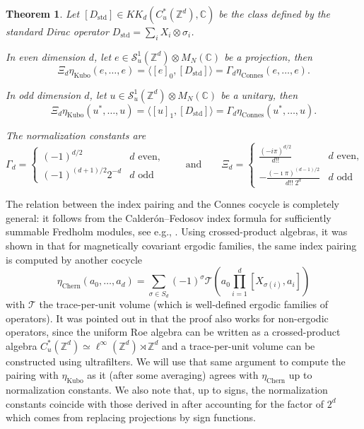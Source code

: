 \documentclass[12pt]{amsart}
\newtheorem{theorem}{Theorem}[section]
\newcommand{\CM}{{\mathbb C}}
\newcommand{\ZM}{{\mathbb Z}}
\newcommand{\Ss}{{\mathcal S}}
\newcommand{\Tt}{{\mathcal T}}
\begin{document}
\begin{theorem}
\label{th:kubozd}
Let $[D_{\mathrm{std}}]\in KK_{d}(C^*_u(\ZM^d),\CM)$ be the class defined by the standard Dirac operator $D_{\mathrm{std}} = \sum_i X_i \otimes \sigma_i$.

In even dimension $d$, let $e \in \Ss_u^1(\ZM^d) \otimes M_N(\CM)$ be a projection, then
$$ \Xi_d \eta_{\mathrm{Kubo}}(e,\dots,e)=\langle [e]_0, [D_{\mathrm{std}}]\rangle = \Gamma_d \eta_{\mathrm{Connes}}(e,\dots,e).$$

In odd dimension $d$, let $u \in \Ss_u^1(\ZM^d) \otimes M_N(\CM)$ be a unitary, then
$$ \Xi_d \eta_{\mathrm{Kubo}}(u^*,\dots,u)= \langle [u]_1, [D_{\mathrm{std}}]\rangle= \Gamma_d \eta_{\mathrm{Connes}}(u^*,\dots,u).$$ 

The normalization constants are
\begin{equation}\label{eqn:dirac_phase_index}
\Gamma_d = \begin{cases}
    (-1)^{d/2}  & d\text{ even}, \\
    (-1)^{(d+1)/2}2^{-d} & d\text{ odd}
\end{cases} \qquad \text{and} \qquad 
\Xi_d = \begin{cases}
    \frac{(-i\pi)^{d/2}}{d!!} & d\text{ even}, \\
    -\frac{ (-\imath \pi)^{(d-1)/2}}{d!!\; 2^d} & d\text{ odd}
\end{cases}
\end{equation}
\end{theorem}
The relation between the index pairing and the Connes cocycle is completely general: it follows from the Calderón–Fedosov index formula for sufficiently summable Fredholm modules, see e.g., \cite{ProdanSchulzBaldes2016B}. Using crossed-product algebras, it was shown in \cite[Chapter 6]{ProdanSchulzBaldes2016} that for magnetically covariant ergodic families, the same index pairing is computed by another cocycle
\begin{equation}
\label{eq:chern_cocycle}
\eta_{\mathrm{Chern}}(a_0,\ldots,a_d)= \sum_{\sigma \in S_d} (-1)^{\sigma} \Tt(a_0 \prod_{i=1}^d [X_{\sigma(i)}, a_i])
\end{equation}
with $\Tt$ the trace-per-unit volume (which is well-defined ergodic families of operators). It was pointed out in \cite{Kubota17} that the proof also works for non-ergodic operators, since the uniform Roe algebra can be written as a crossed-product algebra $C^*_u(\ZM^d)\simeq \ell^\infty(\ZM^d)\rtimes \ZM^d$ and a trace-per-unit volume can be constructed using ultrafilters. We will use that same argument to compute the pairing with $\eta_{\mathrm{Kubo}}$ as it (after some averaging) agrees with $\eta_{\mathrm{Chern}}$ up to normalization constants. We also note that, up to signs, the normalization constants coincide with those derived in \cite{LudewigThiang25} after accounting for the factor of $2^d$ which comes from replacing projections by sign functions.
\end{document}
